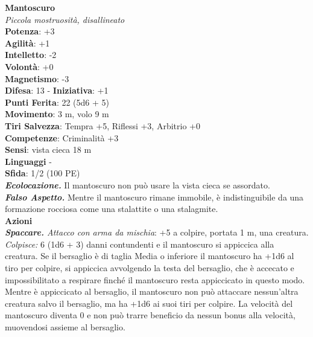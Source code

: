 \begin{multicols}{2}
\medskip\textbf{Mantoscuro}\\
\emph{Piccola mostruosità, disallineato}\\
\textbf{Potenza}: +3\\
\textbf{Agilità}: +1\\
\textbf{Intelletto}: -2\\
\textbf{Volontà}: +0\\
\textbf{Magnetismo}: -3\\
\textbf{Difesa}: 13 - \textbf{Iniziativa}: +1\\
\textbf{Punti Ferita}: 22 (5d6 + 5)\\
\textbf{Movimento}: 3 m, volo 9 m\\
\textbf{Tiri Salvezza}: Tempra +5, Riflessi +3, Arbitrio +0\\
\textbf{Competenze}: Criminalità +3\\
\textbf{Sensi}: vista cieca 18 m\\
\textbf{Linguaggi} -\\
\textbf{Sfida}: 1/2 (100 PE)\smallskip\\
\emph{\textbf{Ecolocazione.}} Il mantoscuro non può usare la vista cieca se assordato.\\
\emph{\textbf{Falso Aspetto.}} Mentre il mantoscuro rimane immobile, è indistinguibile da una formazione rocciosa come una stalattite o una stalagmite.\\
\smallskip\textbf{Azioni}\\
\emph{\textbf{Spaccare.} Attacco con arma da mischia}: +5 a colpire, portata 1 m, una creatura.\\
\emph{Colpisce:} 6 (1d6 + 3) danni contundenti e il mantoscuro si appiccica alla creatura. Se il bersaglio è di taglia Media o inferiore il mantoscuro ha +1d6 al tiro per colpire, si appiccica avvolgendo la testa del bersaglio, che è accecato e impossibilitato a respirare finché il mantoscuro resta appiccicato in questo modo. \\
Mentre è appiccicato al bersaglio, il mantoscuro non può attaccare nessun'altra creatura salvo il bersaglio, ma ha +1d6 ai suoi tiri per colpire. La velocità del mantoscuro diventa 0 e non può trarre beneficio da nessun bonus alla velocità, muovendosi assieme al bersaglio.\\


\end{multicols}

